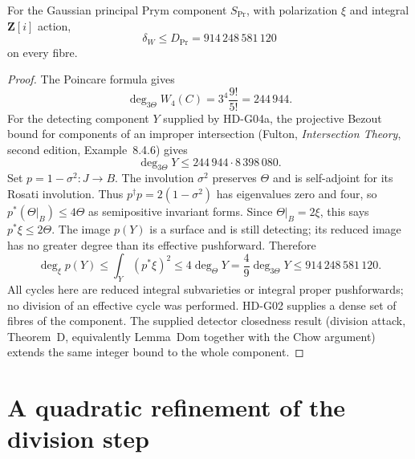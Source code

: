\begin{theorem}
\label{HD-G04}
For the Gaussian principal Prym component $S_{\mathrm{Pr}}$, with
polarization $\xi$ and integral $\mathbf Z[i]$ action,
\[
 \delta_W\le D_{\mathrm{Pr}}=914\,248\,581\,120
\]
on every fibre.
\end{theorem}
\begin{proof}
The Poincare formula gives
\[
 \deg_{3\Theta}W_4(C)=3^4\frac{9!}{5!}=244\,944.
\]
For the detecting component $Y$ supplied by HD-G04a, the projective
Bezout bound for components of an improper intersection (Fulton,
\emph{Intersection Theory}, second edition, Example~8.4.6) gives
\[
 \deg_{3\Theta}Y\le244\,944\cdot8\,398\,080.
\]
Set $p=1-\sigma^2:J\to B$. The involution $\sigma^2$ preserves
$\Theta$ and is self-adjoint for its Rosati involution. Thus
$p^\dagger p=2(1-\sigma^2)$ has eigenvalues zero and four, so
$p^*(\Theta|_B)\le4\Theta$ as semipositive invariant forms.
Since $\Theta|_B=2\xi$, this says $p^*\xi\le2\Theta$.
The image $p(Y)$ is a surface and is still detecting; its reduced
image has no greater degree than its effective pushforward. Therefore
\[
 \deg_\xi p(Y)
 \le \int_Y(p^*\xi)^2
 \le4\deg_\Theta Y
 =\frac49\deg_{3\Theta}Y
 \le914\,248\,581\,120.
\]
All cycles here are reduced integral subvarieties or integral proper
pushforwards; no division of an effective cycle was performed.
HD-G02 supplies a dense set of fibres of the component. The supplied
detector closedness result (division attack, Theorem~D, equivalently
Lemma~Dom together with the Chow argument) extends the same integer
bound to the whole component.
\end{proof}

\section{A quadratic refinement of the division step}

